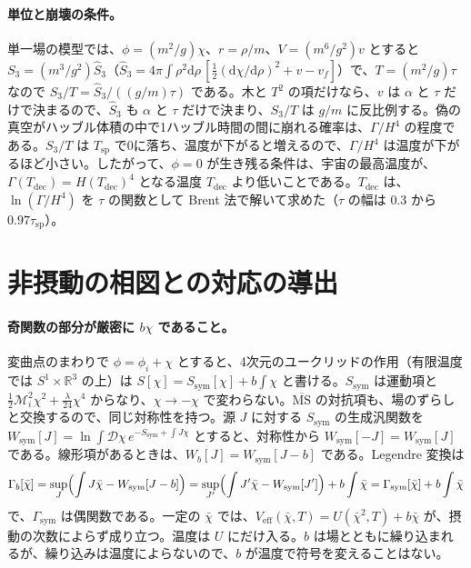 \documentclass[a4paper,10pt]{ltjsarticle}
\newcommand{\dd}{\mathrm{d}}
\begin{document}
\paragraph{単位と崩壊の条件。}単一場の模型では、$\phi=(m^2/g)\chi$、$r=\rho/m$、$V=(m^6/g^2)v$ とすると $S_3=(m^3/g^2)\hat S_3$（$\hat S_3=4\pi\int\rho^2\dd\rho\,[\frac12(\dd\chi/\dd\rho)^2+v-v_f]$）で、$T=(m^2/g)\tau$ なので $S_3/T=\hat S_3/((g/m)\tau)$ である。木と $T^2$ の項だけなら、$v$ は $\alpha$ と $\tau$ だけで決まるので、$\hat S_3$ も $\alpha$ と $\tau$ だけで決まり、$S_3/T$ は $g/m$ に反比例する。偽の真空がハッブル体積の中で1ハッブル時間の間に崩れる確率は、$\Gamma/H^4$ の程度である。$S_3/T$ は $T_{\mathrm{sp}}$ で0に落ち、温度が下がると増えるので、$\Gamma/H^4$ は温度が下がるほど小さい。したがって、$\phi=0$ が生き残る条件は、宇宙の最高温度が、$\Gamma(T_{\mathrm{dec}})=H(T_{\mathrm{dec}})^4$ となる温度 $T_{\mathrm{dec}}$ より低いことである。$T_{\mathrm{dec}}$ は、$\ln(\Gamma/H^4)$ を $\tau$ の関数として Brent 法で解いて求めた（$\tau$ の幅は $0.3$ から $0.97\tau_{\mathrm{sp}}$）。

\section{非摂動の相図との対応の導出}\label{app:nonpert}

\paragraph{奇関数の部分が厳密に $b\chi$ であること。}変曲点のまわりで $\phi=\phi_i+\chi$ とすると、4次元のユークリッドの作用（有限温度では $S^1\times\mathbb R^3$ の上）は $S[\chi]=S_{\mathrm{sym}}[\chi]+b\int\chi$ と書ける。$S_{\mathrm{sym}}$ は運動項と $\frac12\mathcal M_i^2\chi^2+\frac\lambda{24}\chi^4$ からなり、$\chi\to-\chi$ で変わらない。$\overline{\mathrm{MS}}$ の対抗項も、場のずらしと交換するので、同じ対称性を持つ。源 $J$ に対する $S_{\mathrm{sym}}$ の生成汎関数を $W_{\mathrm{sym}}[J]=\ln\int\mathcal D\chi\,e^{-S_{\mathrm{sym}}+\int J\chi}$ とすると、対称性から $W_{\mathrm{sym}}[-J]=W_{\mathrm{sym}}[J]$ である。線形項があるときは、$W_b[J]=W_{\mathrm{sym}}[J-b]$ である。Legendre 変換は
\begin{equation*}
\Gamma_b[\bar\chi]=\sup_J\Bigl(\int J\bar\chi-W_{\mathrm{sym}}[J-b]\Bigr)=\sup_{J'}\Bigl(\int J'\bar\chi-W_{\mathrm{sym}}[J']\Bigr)+b\int\bar\chi=\Gamma_{\mathrm{sym}}[\bar\chi]+b\int\bar\chi
\end{equation*}
で、$\Gamma_{\mathrm{sym}}$ は偶関数である。一定の $\bar\chi$ では、$V_{\mathrm{eff}}(\bar\chi,T)=U(\bar\chi^2,T)+b\bar\chi$ が、摂動の次数によらず成り立つ。温度は $U$ にだけ入る。$b$ は場とともに繰り込まれるが、繰り込みは温度によらないので、$b$ が温度で符号を変えることはない。
\end{document}

